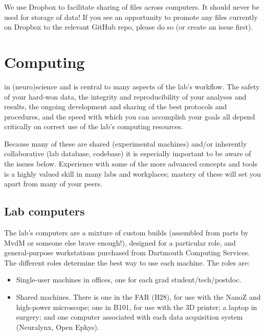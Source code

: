 \documentclass{tufte-book}
\begin{document}
We use Dropbox to facilitate sharing of files across computers. It
should never be used for storage of data! If you see an opportunity to
promote any files currently on Dropbox to the relevant GitHub repo,
please do so (or create an issue first).

\chapter{Computing}

 in
(neuro)science and is central to many aspects of the lab's
workflow. The safety of your hard-won data, the integrity and
reproducibility of your analyses and results, the ongoing development
and sharing of the best protocols and procedures, and the speed with
which you can accomplish your goals all depend critically on correct
use of the lab's computing resources.

Because many of these are shared (experimental machines) and/or
inherently collaborative (lab database, codebase) it is especially
important to be aware of the issues below. Experience with some of the
more advanced concepts and tools is a highly valued skill in many labs
and workplaces; mastery of these will set you apart from many of your
peers.

\section{Lab computers}

The lab's computers are a mixture of custom builds (assembled from
parts by MvdM or someone else brave enough!), designed for a
particular role, and general-purpose workstations purchased from
Dartmouth Computing Services. The different roles determine the best
way to use each machine. The roles are:

\begin{itemize}
\item{Single-user machines in offices, one for each grad
student/tech/postdoc.}
\item{Shared machines. There is one in the FAR (B28), for use with the
  NanoZ and high-power microscope; one in B101, for use with the 3D
  printer; a laptop in surgery; and one computer associated with each
  data acquisition system (Neuralynx, Open Ephys).}
\end{itemize}
\end{document}
